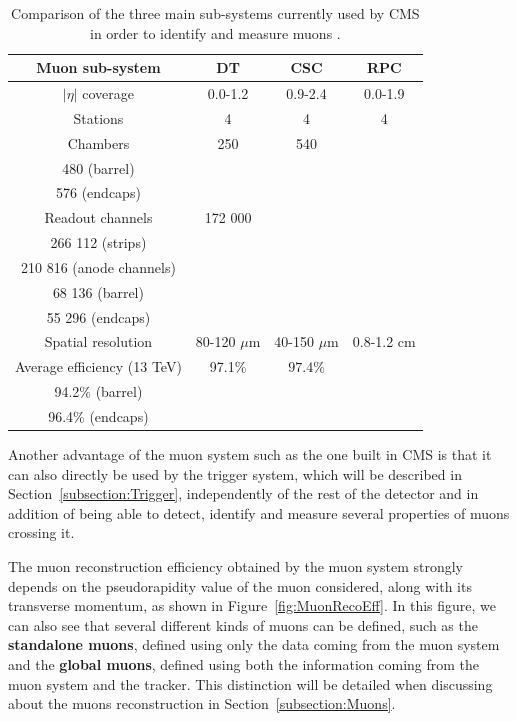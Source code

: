\documentclass[a4paper, 10pt, openright]{report}
\begin{document}
\begin{table}[h!]
\begin{center}
\begin{tabular}{ c|c|c|c } 
 \hline
 Muon sub-system & \ac{DT} & \ac{CSC} & \ac{RPC} \\
 \hline
 $|\eta|$ coverage & 0.0-1.2 & 0.9-2.4 & 0.0-1.9 \\
 Stations & 4 & 4 & 4 \\
 Chambers & 250 & 540 & \makecell{\vspace{-10pt} \\ 480 (barrel) \\ 576 (endcaps)} \\
 Readout channels & 172 000 & \makecell{\vspace{-10pt} \\ 266 112 (strips) \\ 210 816 (anode channels)} & \makecell{\vspace{-10pt} \\ 68 136 (barrel) \\ 55 296 (endcaps)} \\
 Spatial resolution & 80-120 $\mu$m & 40-150 $\mu$m & 0.8-1.2 cm \\
 Average efficiency (13 TeV) & 97.1\% & $97.4$\% & \makecell{\vspace{-10pt} \\ 94.2\% (barrel) \\ 96.4\% (endcaps)} \\ 
 \hline
\end{tabular}
\caption{Comparison of the three main sub-systems currently used by \ac{CMS} in order to identify and measure muons \cite{MuonSystemsEff}.}
\label{table:CMSMuonsSystems}
\end{center}
\end{table}

Another advantage of the muon system such as the one built in \ac{CMS} is that it can also directly be used by the trigger system, which will be described in Section~\ref{subsection:Trigger}, independently of the rest of the detector and in addition of being able to detect, identify and measure several properties of muons crossing it.

The muon reconstruction efficiency obtained by the muon system strongly depends on the pseudorapidity value of the muon considered, along with its transverse momentum, as shown in Figure~\ref{fig:MuonRecoEff}. In this figure, we can also see that several different kinds of muons can be defined, such as the \textbf{standalone muons}, defined using only the data coming from the muon system and the \textbf{global muons}, defined using both the information coming from the muon system and the tracker. This distinction will be detailed when discussing about the muons reconstruction in Section~\ref{subsection:Muons}. %
\end{document}
